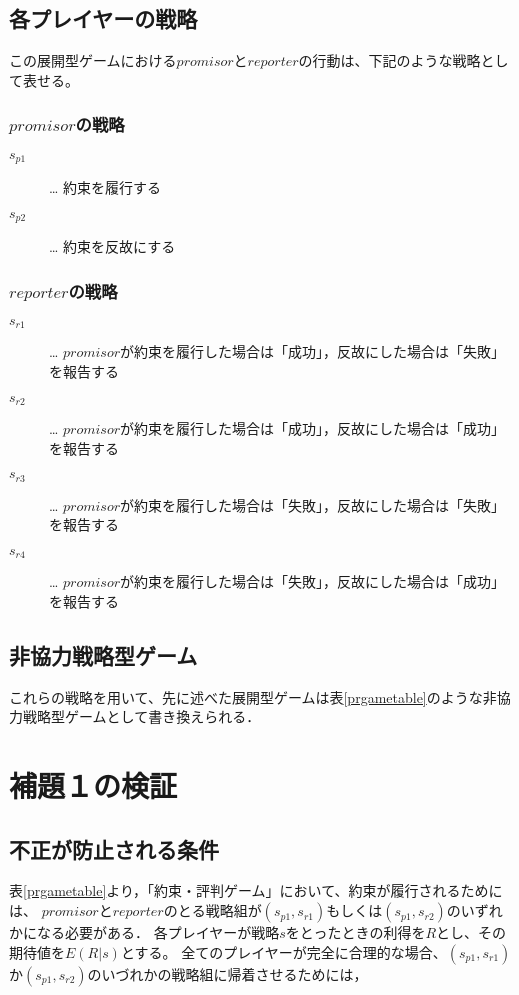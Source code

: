

\subsection{各プレイヤーの戦略}
\label{playersStrategy}
この展開型ゲームにおける$promisor$と$reporter$の行動は、下記のような戦略として表せる。

\subsubsection{$promisor$の戦略}
\begin{description}
  \item[$s_{p1}$]… 約束を履行する
  \item[$s_{p2}$]… 約束を反故にする
\end{description}

\subsubsection{$reporter$の戦略}
\begin{description}
  \item[$s_{r1}$]… $promisor$が約束を履行した場合は「成功」，反故にした場合は「失敗」を報告する
  \item[$s_{r2}$]… $promisor$が約束を履行した場合は「成功」，反故にした場合は「成功」を報告する
  \item[$s_{r3}$]… $promisor$が約束を履行した場合は「失敗」，反故にした場合は「失敗」を報告する
  \item[$s_{r4}$]… $promisor$が約束を履行した場合は「失敗」，反故にした場合は「成功」を報告する
\end{description}

\subsection{非協力戦略型ゲーム}
これらの戦略を用いて、先に述べた展開型ゲームは表\ref{prgametable}のような非協力戦略型ゲームとして書き換えられる．


\section{補題１の検証}
\label{verification1}
\subsection{不正が防止される条件}
表\ref{prgametable}より，「約束・評判ゲーム」において、約束が履行されるためには、
$promisor$と$reporter$のとる戦略組が$ (s_{p1}, s_{r1})$もしくは$(s_{p1}, s_{r2})$のいずれかになる必要がある．
各プレイヤーが戦略$s$をとったときの利得を$R$とし、その期待値を$E(R|s)$とする。
全てのプレイヤーが完全に合理的な場合、$(s_{p1}, s_{r1})$か$(s_{p1}, s_{r2})$のいづれかの戦略組に帰着させるためには，

